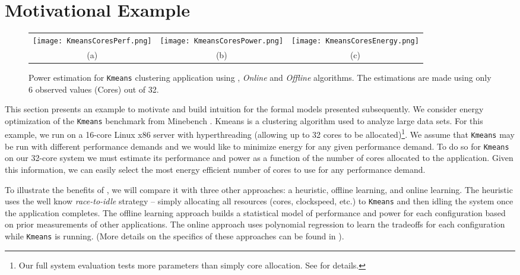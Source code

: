\section{Motivational Example}
\label{sec:example}
\begin{figure*}
\begin{center}
\begin{tabular}[t!]{ccc}\hspace*{-15pt}    	
	\texttt{[image: KmeansCoresPerf.png]}&
	\texttt{[image: KmeansCoresPower.png]}&
	\texttt{[image: KmeansCoresEnergy.png]}\\
	 {(a)} &
	 {(b)} &
	  {(c)}
\end{tabular}
\vspace{-0.35em}
\caption{Power estimation for \texttt{Kmeans}
  clustering application using \SYSTEM{}, \textit{Online} and
  \textit{Offline} algorithms. The estimations are made using only 6
  observed values (Cores) out of 32.}
\label{fig:Kmeans}
\end{center}
\end{figure*}
\vspace{-0.35em} This section presents an example to motivate
\SYSTEM{} and build intuition for the formal models presented
subsequently.  We consider energy optimization of the \texttt{Kmeans}
benchmark from Minebench \cite{minebench}.  Kmeans is a clustering
algorithm used to analyze large data sets.  For this example, we run
on a 16-core Linux x86 server with hyperthreading (allowing up to 32
cores to be allocated)\footnote{Our full system evaluation tests more
  parameters than simply core allocation.  See 
  for details.}.  We assume that \texttt{Kmeans} may be run with
different performance demands and we would like to minimize energy for
any given performance demand.  To do so for \texttt{Kmeans} on our
32-core system we must estimate its performance and power as a
function of the number of cores allocated to the application.  Given
this information, we can easily select the most energy efficient
number of cores to use for any performance demand.

To illustrate the benefits of \SYSTEM{}, we will compare it with three
other approaches: a heuristic, offline learning, and online learning.
The heuristic uses the well know \emph{race-to-idle} strategy --
simply allocating all resources (cores, clockspeed, etc.) to \texttt{Kmeans}
and then idling the system once the application completes.  The
offline learning approach builds a statistical model of performance
and power for each configuration based on prior measurements of other
applications.  The online approach uses polynomial regression to learn
the tradeoffs for each configuration while \texttt{Kmeans} is running. (More
details on the specifics of these approaches can be found in
).

